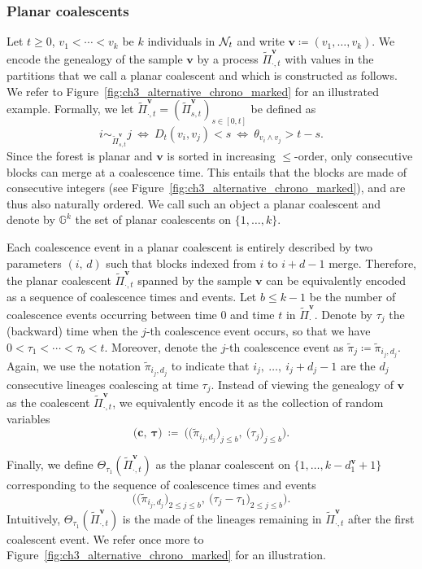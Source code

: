 \begin{refsegment}
\subsubsection*{Planar coalescents}

Let $t\geqslant 0$, $v_1<\cdots<v_{k}$ be $k$ individuals in ${\cal N}_t$ and write ${\bm
v}\coloneqq(v_1,\ldots,v_k)$.
We encode the genealogy of the sample $\bm{v}$ by a process
$\tilde\Pi^{\bm{v}}_{\cdot, t}$ with values in the partitions that we call a planar coalescent and which is constructed as follows. We refer to
Figure~\ref{fig:ch3_alternative_chrono_marked} for an illustrated example.
Formally, we let $\tilde\Pi^{\bm{v}}_{\cdot, t} = (\tilde\Pi^{\bm{v}}_{s,t})_{s \in [0,t]}$ be
defined as 
\[
    i \sim_{\tilde\Pi^{\bm{v}}_{s,t}} j\ \iff\ D_t(v_i, v_j) < s
   \ \iff\ \theta_{v_i \wedge v_j} > t - s.
\]
Since the forest is planar and $\bm{v}$ is sorted in increasing
$\leqslant$-order, only consecutive blocks can merge at a coalescence time. This
entails that the blocks are made of consecutive integers (see
Figure~\ref{fig:ch3_alternative_chrono_marked}), and are thus also naturally
ordered. We call such an object a planar coalescent and  denote by
$\mathbb{G}^k$ the set of planar coalescents on $\{1,\ldots, k\}$.
 
Each coalescence event in a planar coalescent is entirely described by
two parameters $(i,\, d)$ such that blocks indexed from $i$ to $i+d-1$
merge. Therefore, the planar coalescent $\tilde\Pi^{\bm{v}}_{\cdot, t}$ spanned by
the sample $\bm{v}$ can be equivalently encoded as a sequence of
coalescence times and events. 
Let $b\leqslant k-1$ be the number of coalescence events occurring
between time $0$ and time $t$ in $\tilde\Pi^{\bm v}_{\cdot}$. 
Denote by $\tau_j$ the (backward) time when the $j$-th
coalescence event occurs, so that we have $0<\tau_1 < \cdots <
\tau_b<t$. Moreover, denote the $j$-th coalescence event as
$ \tilde\pi_j \coloneqq \tilde\pi_{i_j, d_j}$. Again, we use the
notation $\tilde\pi_{i_j, d_j}$ to indicate that $i_j,~\ldots,~i_j+d_j-1$ are the $d_j$
consecutive lineages coalescing at time $\tau_j$. 
Instead of viewing the genealogy of $\bm{v}$ as the coalescent
$\tilde\Pi^{\bm{v}}_{\cdot, t}$, we equivalently encode it as the collection of random
variables
\[
\big({\bm  c},\ \bm{\tau}\big) \ \coloneqq \   \Big(\big(\tilde\pi_{i_j, d_j}\big)_{j\leqslant b},\ \big(\tau_j\big)_{j\leqslant b}\Big).
\]

Finally, we define $\Theta_{\tau_1}(\tilde\Pi^{\bm{v}}_{\cdot, t})$ as the planar
coalescent on $\{1,\ldots,k-d^{\bm{v}}_1+1\}$ corresponding to the sequence of coalescence
times and events
\begin{equation}\label{eq:pruning:coalescent}
\Big(\big(\tilde\pi_{i_j,d_j}\big)_{2\leqslant j\leqslant b},\ \big(\tau_j-\tau_1\big)_{2\leqslant j \leqslant b}\Big).
\end{equation}
Intuitively, $\Theta_{\tau_1}(\tilde\Pi^{\bm{v}}_{\cdot, t})$ is the made of the
lineages remaining in $\tilde\Pi^{\bm{v}}_{\cdot, t}$ after the first coalescent event. We
refer once more to Figure~\ref{fig:ch3_alternative_chrono_marked} for an
illustration.


\end{refsegment}
